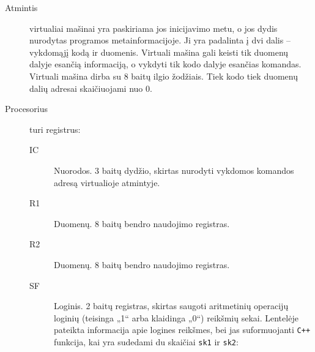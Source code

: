 \begin{description}
  \item[Atmintis] virtualiai mašinai yra paskiriama jos inicijavimo metu,
    o jos dydis nurodytas programos metainformacijoje.
    Ji yra padalinta į dvi dalis – vykdomąjį kodą ir duomenis. Virtuali
    mašina gali keisti tik duomenų dalyje esančią informaciją, o vykdyti
    tik kodo dalyje esančias komandas. Virtuali mašina dirba su 
    8 baitų ilgio žodžiais. Tiek kodo tiek duomenų dalių adresai 
    skaičiuojami nuo 0.
  \item[Procesorius] turi registrus:
    \begin{description}
      \item[IC] Nuorodos. 3 baitų dydžio, skirtas nurodyti vykdomos komandos
        adresą virtualioje atmintyje.
      \item[R1] Duomenų. 8 baitų bendro naudojimo registras.
      \item[R2] Duomenų. 8 baitų bendro naudojimo registras.
      \item[SF] Loginis. 2 baitų registras, skirtas saugoti aritmetinių 
        operacijų 
        loginių (teisinga „1“ arba klaidinga „0“) reikšmių sekai. Lentelėje
        pateikta informacija apie logines reikšmes, bei jas suformuojanti
        \verb|C++| funkcija, kai yra sudedami du skaičiai \verb|sk1| ir
        \verb|sk2|:


\end{description}
\end{description}
